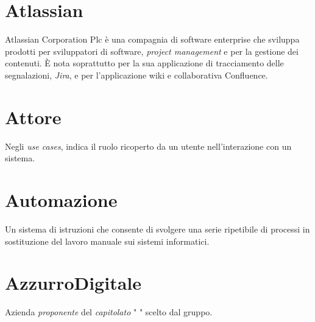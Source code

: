 \section{Atlassian}
Atlassian Corporation Plc è una compagnia di software enterprise che sviluppa prodotti per sviluppatori di software, \emph{project management} e per la gestione dei contenuti. È nota soprattutto per la sua applicazione di tracciamento delle segnalazioni, \emph{Jira}, e per l'applicazione wiki e collaborativa Confluence.

\section{Attore}\label{sec:Attori}
Negli \emph{use cases}, indica il ruolo ricoperto da un utente nell'interazione con un sistema.

\section{Automazione}\label{sec:Automazioni}
Un sistema di istruzioni che consente di svolgere una serie ripetibile di processi in sostituzione del lavoro manuale sui sistemi informatici.

\section{AzzurroDigitale}
Azienda \emph{proponente} del \emph{capitolato} " " scelto dal gruppo.
